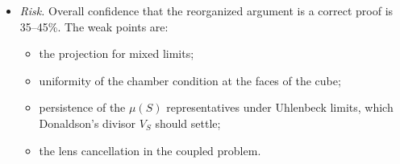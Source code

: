 \documentclass[10pt]{amsart}
\theoremstyle{definition}\newtheorem{definition}[theorem]{Definition}\newtheorem{remark}[theorem]{Remark}
\newcommand{\V}{\textsf{[V]}}\newcommand{\Pl}{\textsf{[P]}}\newcommand{\Sp}{\textsf{[S]}}
\begin{document}
\begin{itemize}
\begin{itemize}
\item For $\pm p$ with $p\ge3$ it fails at the outset, because of non-central $U(1)$ flats \V.
\item With spacing $1$ (no cosmetic map) the exclusions provably fail, as they must.
\end{itemize}
\item \emph{Risk.} Overall confidence that the reorganized argument is a correct proof is 35--45\%. The weak points are:
\begin{itemize}
\item the projection for mixed limits;
\item uniformity of the chamber condition at the faces of the cube;
\item persistence of the $\mu(S)$ representatives under Uhlenbeck limits, which Donaldson's divisor $V_S$ should settle;
\item the lens cancellation in the coupled problem.
\end{itemize}
\end{itemize}
\end{document}

